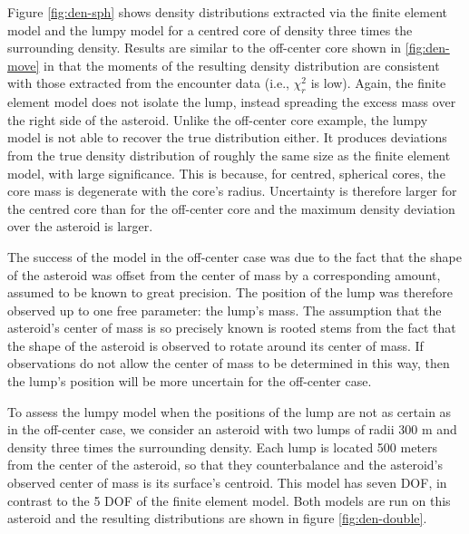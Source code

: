 \documentclass[fleqn,usenatbib]{mnras}
\begin{document}
Figure \ref{fig:den-sph} shows density distributions extracted via the finite element model and the lumpy model for a centred core of density three times the surrounding density. Results are similar to the off-center core shown in \ref{fig:den-move} in that the moments of the resulting density distribution are consistent with those extracted from the encounter data (i.e., $\chi^2_r$ is low). Again, the finite element model does not isolate the lump, instead spreading the excess mass over the right side of the asteroid. Unlike the off-center core example, the lumpy model is not able to recover the true distribution either. It produces deviations from the true density distribution of roughly the same size as the finite element model, with large significance. This is because, for centred, spherical cores, the core mass is degenerate with the core's radius. Uncertainty is therefore larger for the centred core than for the off-center core and the maximum density deviation over the asteroid is larger.

The success of the model in the off-center case was due to the fact that the shape of the asteroid was offset from the center of mass by a corresponding amount, assumed to be known to great precision. The position of the lump was therefore observed up to one free parameter: the lump's mass. The assumption that the asteroid's center of mass is so precisely known is rooted stems from the fact that the shape of the asteroid is observed to rotate around its center of mass. If observations do not allow the center of mass to be determined in this way, then the lump's position will be more uncertain for the off-center case.

To assess the lumpy model when the positions of the lump are not as certain as in the off-center case, we consider an asteroid with two lumps of radii 300 m and density three times the surrounding density. Each lump is located 500 meters from the center of the asteroid, so that they counterbalance and the asteroid's observed center of mass is its surface's centroid. This model has seven DOF, in contrast to the 5 DOF of the finite element model. Both models are run on this asteroid and the resulting distributions are shown in figure \ref{fig:den-double}.
\end{document}
